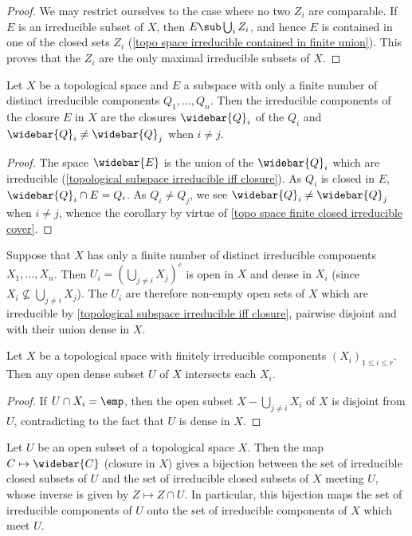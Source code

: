 \begin{proof}
We may restrict ourselves to the case where no two $Z_i$ are comparable. If $E$ is an irreducible subset of $X$, then $E\sub\bigcup_iZ_i$, and hence $E$ is contained in one of the closed sets $Z_i$ (\cref{topo space irreducible contained in finite union}). This proves that the $Z_i$ are the only maximal irreducible subsets of $X$.
\end{proof}
\begin{corollary}\label{topo space subspace finite irre component prop}
Let $X$ be a topological space and $E$ a subspace with only a finite number of distinct irreducible components $Q_1,\dots,Q_n$. Then the irreducible components of the closure $E$ in $X$ are the closures $\widebar{Q}_i$ of the $Q_i$ and $\widebar{Q}_i\neq\widebar{Q}_j$ when $i\neq j$.
\end{corollary}
\begin{proof}
The space $\widebar{E}$ is the union of the $\widebar{Q}_i$ which are irreducible (\cref{topological subspace irreducible iff closure}). As $Q_i$ is closed in $E$, $\widebar{Q}_i\cap E=Q_i$. As $Q_i\neq Q_j$, we see $\widebar{Q}_i\neq\widebar{Q}_j$ when $i\neq j$, whence the corollary by virtue of \cref{topo space finite closed irreducible cover}.
\end{proof}
\begin{example}
Suppose that $X$ has only a finite number of distinct irreducible components $X_1,\dots,X_n$. Then $U_i=(\bigcup_{j\neq i}X_j)^c$ is open in $X$ and dense in $X_i$ (since $X_i\nsubseteq\bigcup_{j\neq i}X_j$). The $U_i$ are therefore non-empty open sets of $X$ which are irreducible by \cref{topological subspace irreducible iff closure}, pairwise disjoint and with their union dense in $X$.
\end{example}
\begin{proposition}\label{topo space open dense intersect irre component}
Let $X$ be a topological space with finitely irreducible components $(X_i)_{1\leq i\leq r}$. Then any open dense subset $U$ of $X$ intersects each $X_i$.
\end{proposition}
\begin{proof}
If $U\cap X_i=\emp$, then the open subset $X-\bigcup_{j\neq i}X_i$ of $X$ is disjoint from $U$, contradicting to the fact that $U$ is dense in $X$.
\end{proof}
\begin{proposition}\label{topo space open irre closed intersection}
Let $U$ be an open subset of a topological space $X$. Then the map $C\mapsto\widebar{C}$ (closure in $X$) gives a bijection between the set of irreducible closed subsets of $U$ and the set of irreducible closed subsets of $X$ meeting $U$, whose inverse is given by $Z\mapsto Z\cap U$. In particular, this bijection maps the set of irreducible components of $U$ onto the set of irreducible components of $X$ which meet $U$.
\end{proposition}

